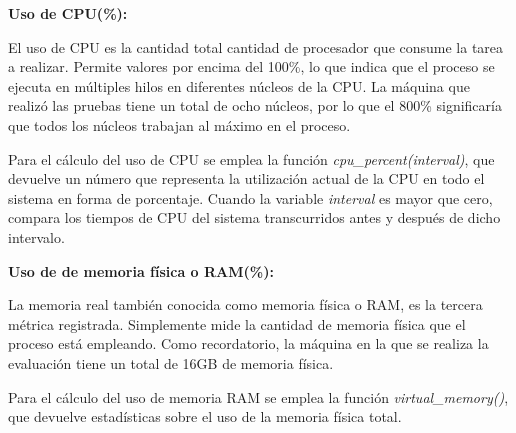 \textbf{Uso de CPU(\%):}

El uso de CPU es la cantidad total cantidad de procesador que consume la tarea a realizar. Permite valores 
por encima del 100\%, lo que indica que el proceso se ejecuta en múltiples hilos en diferentes núcleos de 
la CPU. La máquina que realizó las pruebas tiene un total de ocho núcleos, por lo que el 800\% significaría
que todos los núcleos trabajan al máximo en el proceso.

Para el cálculo del uso de CPU se emplea la función \emph{cpu\_percent(interval)}, que devuelve un número 
que representa la utilización actual de la CPU en todo el sistema en forma de porcentaje. Cuando la variable 
\emph{interval} es mayor que cero, compara los tiempos de CPU del sistema transcurridos antes y después de 
dicho intervalo.

\textbf{Uso de de memoria física o RAM(\%):}

La memoria real también conocida como memoria física o RAM, es la tercera métrica registrada. Simplemente 
mide la cantidad de memoria física que el proceso está empleando. Como recordatorio, la máquina en la que 
se realiza la evaluación tiene un total de 16GB de memoria física.

Para el cálculo del uso de memoria RAM se emplea la función \emph{virtual\_memory()}, que devuelve 
estadísticas sobre el uso de la memoria física total.






































